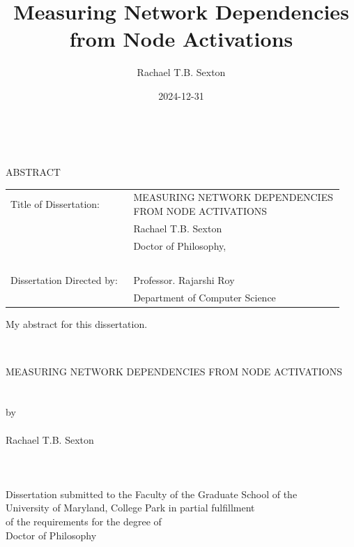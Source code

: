 \documentclass[%
	12pt,
		oneside,
		letterpaper
]{book}
\title{Measuring Network Dependencies from Node Activations}
\author{Rachael T.B. Sexton}
\date{2024-12-31}
\begin{document}
\pagestyle{empty}
\singlespacing

\hbox{\ }

\begin{center}
\large{{ABSTRACT}}

\vspace{3em}

\end{center}
\hspace{-.15in}
\begin{tabular}{p{0.35\linewidth}p{0.6\linewidth}}
Title of Dissertation:     & {\large \uppercase{Measuring Network
Dependencies from Node Activations}}\\
                           & {\large  Rachael T.B. Sexton } \\
                           & {\large Doctor of Philosophy, } \\
\                         \\
Dissertation Directed by:  & {\large Professor. Rajarshi Roy } \\
                           & {\large Department of Computer Science} \\
\end{tabular}

\vspace{3em}


\renewcommand{\baselinestretch}{2}
\large \normalsize
My abstract for this dissertation.\par
\clearpage%

\thispagestyle{empty} \hbox{\ } \vspace{1.5in}
\renewcommand{\baselinestretch}{1}
\small\normalsize
\begin{center}

\large{\uppercase{Measuring Network Dependencies from Node
Activations}}\\
\ \\ 
\ \\
\large{by} \\
\ \\
\large{Rachael T.B. Sexton}
\ \\
\ \\
\ \\
\ \\
\normalsize
Dissertation submitted to the Faculty of the Graduate School of the \\
University of Maryland, College Park in partial fulfillment \\
of the requirements for the degree of \\
Doctor of Philosophy \\

\end{center}
\end{document}
